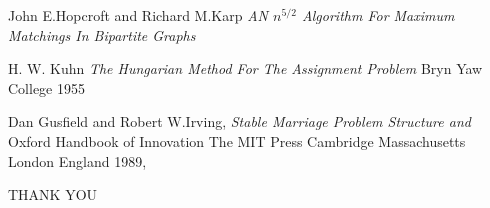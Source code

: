 \documentclass[11pt]{beamer}
\theoremstyle{definition}
\begin{document}
\begin{thebibliography}{9}

John E.Hopcroft
and 
Richard M.Karp
  \emph{AN $n^{5/2}$ Algorithm For Maximum Matchings
In Bipartite Graphs}

H.
W.
Kuhn
\emph{The Hungarian Method For The
Assignment Problem}
Bryn Yaw College 1955

Dan Gusfield and Robert W.Irving,
\emph{Stable Marriage Problem Structure and}
Oxford Handbook of Innovation
The MIT Press
Cambridge Massachusetts London England
1989,




\end{thebibliography}
\begin{frame}
\begin{center}



\Huge{THANK YOU}
\end{center}
\end{frame}
\end{document}
